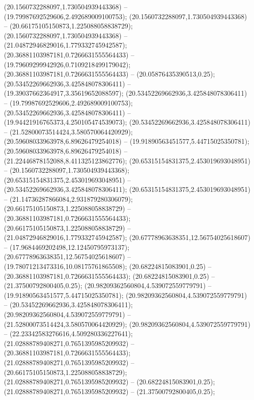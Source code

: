  (20.1560732288097,1.730504939443368) -- (19.79987692529606,2.492689009100753);
 (20.1560732288097,1.730504939443368) -- (20.66175105150873,1.225088058838729);
 (20.1560732288097,1.730504939443368) -- (21.04872946829016,1.779332745942587);
 (20.36881103987181,0.7266631555564433) -- (19.79609299942926,0.7109218499179042);
 (20.36881103987181,0.7266631555564433) -- (20.05876435390513,0.25);
 (20.53452269662936,3.425848078306411) -- (19.39037662364917,3.35619652088597);
 (20.53452269662936,3.425848078306411) -- (19.79987692529606,2.492689009100753);
 (20.53452269662936,3.425848078306411) -- (19.94421916765373,4.250105474539073);
 (20.53452269662936,3.425848078306411) -- (21.52800073514424,3.580570064420929);
 (20.59608033963978,6.89626479254018) -- (19.91890563451577,5.44715025350781);
 (20.59608033963978,6.89626479254018) -- (21.22446878152088,8.411325123862776);
 (20.65315154831375,2.453019693048951) -- (20.1560732288097,1.730504939443368);
 (20.65315154831375,2.453019693048951) -- (20.53452269662936,3.425848078306411);
 (20.65315154831375,2.453019693048951) -- (21.14736287866084,2.931879280306079);
 (20.66175105150873,1.225088058838729) -- (20.36881103987181,0.7266631555564433);
 (20.66175105150873,1.225088058838729) -- (21.04872946829016,1.779332745942587);
 (20.67778963638351,12.56754025618607) -- (17.9684469202498,12.12450795973137);
 (20.67778963638351,12.56754025618607) -- (19.78071213473316,10.08175761865508);
 (20.68224815083901,0.25) -- (20.36881103987181,0.7266631555564433);
 (20.68224815083901,0.25) -- (21.37500792800405,0.25);
 (20.98209362560804,4.539072559779791) -- (19.91890563451577,5.44715025350781);
 (20.98209362560804,4.539072559779791) -- (20.53452269662936,3.425848078306411);
 (20.98209362560804,4.539072559779791) -- (21.52800073514424,3.580570064420929);
 (20.98209362560804,4.539072559779791) -- (22.23342583276616,4.509280336227641);
 (21.02888789408271,0.7651395985209932) -- (20.36881103987181,0.7266631555564433);
 (21.02888789408271,0.7651395985209932) -- (20.66175105150873,1.225088058838729);
 (21.02888789408271,0.7651395985209932) -- (20.68224815083901,0.25);
 (21.02888789408271,0.7651395985209932) -- (21.37500792800405,0.25);
